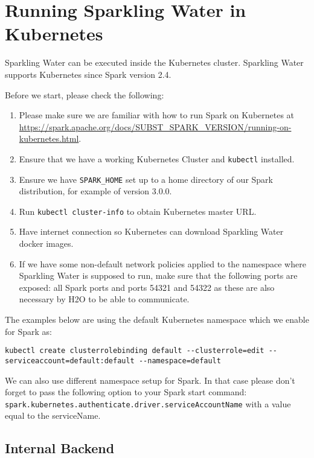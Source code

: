 \section{Running Sparkling Water in Kubernetes}

Sparkling Water can be executed inside the Kubernetes cluster. Sparkling Water supports Kubernetes since Spark version 2.4.

Before we start, please check the following:

\begin{enumerate}
    \item Please make sure we are familiar with how to run Spark on Kubernetes at \url{https://spark.apache.org/docs/SUBST_SPARK_VERSION/running-on-kubernetes.html}.
    \item Ensure that we have a working Kubernetes Cluster and \texttt{kubectl} installed.
    \item Ensure we have \texttt{SPARK\_HOME} set up to a home directory of our Spark distribution, for example of version 3.0.0.
    \item Run \texttt{kubectl cluster-info} to obtain Kubernetes master URL.
    \item Have internet connection so Kubernetes can download Sparkling Water docker images.
    \item If we have some non-default network policies applied to the namespace where Sparkling Water is supposed to run, make sure that the following ports are exposed: all Spark ports and ports 54321 and 54322 as these are also necessary by H2O to be able to communicate.
\end{enumerate}

The examples below are using the default Kubernetes namespace which we enable for Spark as:

\begin{lstlisting}[style=Bash]
kubectl create clusterrolebinding default --clusterrole=edit --serviceaccount=default:default --namespace=default
\end{lstlisting}

We can also use different namespace setup for Spark. In that case please don't forget to pass the following option
to your Spark start command: \\
\texttt{spark.kubernetes.authenticate.driver.serviceAccountName} with a value equal to the serviceName.

\subsection{Internal Backend}

